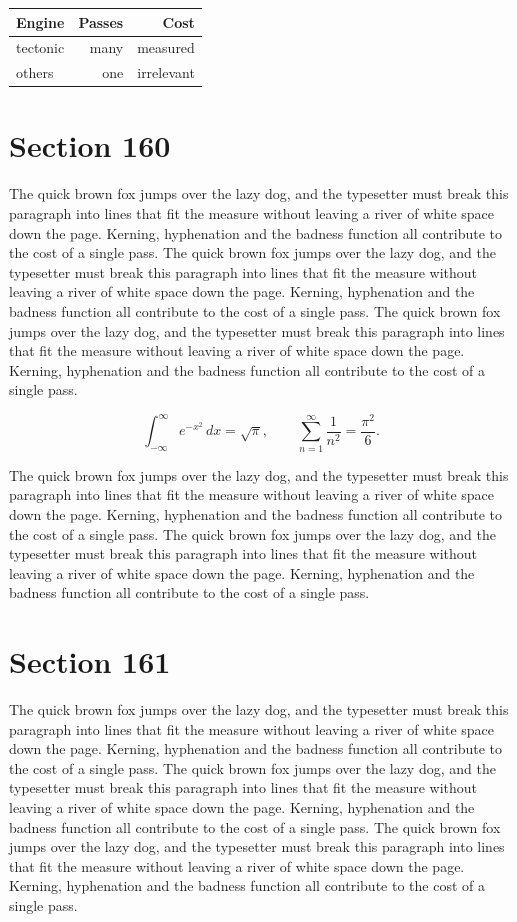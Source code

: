 \documentclass{article}
\begin{document}
\begin{center}
\begin{tabular}{lrr}
\toprule
Engine & Passes & Cost \\
\midrule
tectonic & many & measured \\
others & one & irrelevant \\
\bottomrule
\end{tabular}
\end{center}

\section{Section 160}
The quick brown fox jumps over the lazy dog, and the typesetter must break this paragraph into lines that fit the measure without leaving a river of white space down the page. Kerning, hyphenation and the badness function all contribute to the cost of a single pass. The quick brown fox jumps over the lazy dog, and the typesetter must break this paragraph into lines that fit the measure without leaving a river of white space down the page. Kerning, hyphenation and the badness function all contribute to the cost of a single pass. The quick brown fox jumps over the lazy dog, and the typesetter must break this paragraph into lines that fit the measure without leaving a river of white space down the page. Kerning, hyphenation and the badness function all contribute to the cost of a single pass. 

\begin{equation}
\int_{-\infty}^{\infty} e^{-x^{2}}\,dx = \sqrt{\pi}, \qquad
\sum_{n=1}^{\infty} \frac{1}{n^{2}} = \frac{\pi^{2}}{6}.
\end{equation}

The quick brown fox jumps over the lazy dog, and the typesetter must break this paragraph into lines that fit the measure without leaving a river of white space down the page. Kerning, hyphenation and the badness function all contribute to the cost of a single pass. The quick brown fox jumps over the lazy dog, and the typesetter must break this paragraph into lines that fit the measure without leaving a river of white space down the page. Kerning, hyphenation and the badness function all contribute to the cost of a single pass. 
\section{Section 161}
The quick brown fox jumps over the lazy dog, and the typesetter must break this paragraph into lines that fit the measure without leaving a river of white space down the page. Kerning, hyphenation and the badness function all contribute to the cost of a single pass. The quick brown fox jumps over the lazy dog, and the typesetter must break this paragraph into lines that fit the measure without leaving a river of white space down the page. Kerning, hyphenation and the badness function all contribute to the cost of a single pass. The quick brown fox jumps over the lazy dog, and the typesetter must break this paragraph into lines that fit the measure without leaving a river of white space down the page. Kerning, hyphenation and the badness function all contribute to the cost of a single pass. 
\end{document}
